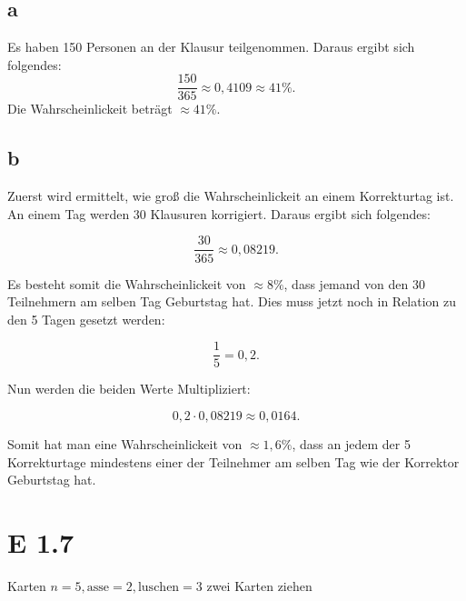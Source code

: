\documentclass[12pt]{article}
\begin{document}
\subsection{a}
Es haben 150 Personen an der Klausur teilgenommen. Daraus ergibt sich folgendes:
\begin{equation}
\frac{150}{365} \approx 0,4109 \approx 41 \%.
\end{equation}
Die Wahrscheinlickeit beträgt $\approx 41\%$.

\subsection{b}
Zuerst wird ermittelt, wie groß die Wahrscheinlickeit an einem Korrekturtag ist. An einem Tag werden
30 Klausuren korrigiert. Daraus ergibt sich folgendes:

\begin{equation}
\frac{30}{365} \approx 0,08219. 
\end{equation}

Es besteht somit die Wahrscheinlickeit von $\approx 8\%$, dass jemand von den 30 Teilnehmern am
selben Tag Geburtstag hat. Dies muss jetzt noch in Relation zu den 5 Tagen gesetzt werden:

\begin{equation}
\frac{1}{5} = 0,2.
\end{equation}


Nun werden die beiden Werte Multipliziert:

\begin{equation}
0,2 \cdot 0,08219 \approx 0,0164.
\end{equation}

Somit hat man eine Wahrscheinlickeit von $\approx 1,6\%$, dass an jedem der 5 Korrekturtage mindestens
einer der Teilnehmer am selben Tag wie der Korrektor Geburtstag hat.

\section{E 1.7}
Karten $n=5, \text{asse}=2, \text{luschen}=3$ zwei Karten ziehen
\end{document}
